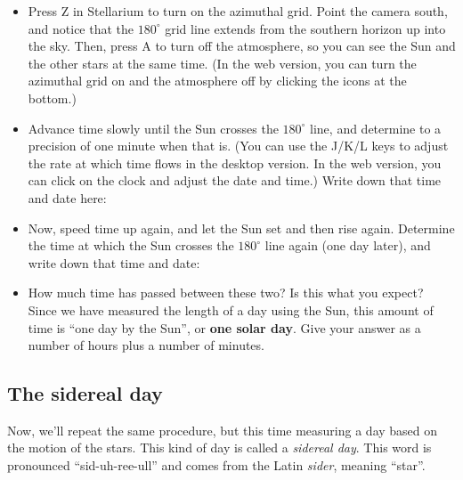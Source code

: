 \documentclass[11pt]{article}
\begin{document}
\begin{itemize}
\item Press Z in Stellarium to turn on the azimuthal grid. Point the camera south, and notice that the $180^\circ$ 
	grid line extends from
the southern horizon up into the sky. Then, press A to turn off the atmosphere, so you can see the Sun and the other stars
		at the same time. (In the web version, you can turn the azimuthal grid on and the atmosphere off
		by clicking the icons at the bottom.)

\item Advance time slowly until the Sun crosses the $180^\circ$ line, and determine to a precision of one minute when that is. 
	(You can use the J/K/L keys to adjust the rate at which time flows in the desktop version. In the web version, you can click
		on the clock and adjust the date and time.)
Write down that time and date here:

\vspace{1in}

\item Now, speed time up again, and let the Sun set and then rise again. 
	Determine the time at which the Sun crosses the $180^\circ$ line again (one day later), and write down that time and date:

		\vspace{1in}

	\item How much time has passed between these two? Is this what you expect? Since we have measured the length of a day
		using the Sun, this amount of time is ``one day by the Sun'', or {\bf one solar day}. Give your answer
		as a number of hours plus a number of minutes.

		\vspace{2in}

\end{itemize}

\subsection{The sidereal day}

Now, we'll repeat the same procedure, but this time measuring a day based on the motion of the stars. This kind of day is called a {\it sidereal day}. This word is pronounced ``sid-uh-ree-ull'' and comes from the Latin {\it sider}, meaning ``star''.
\end{document}
